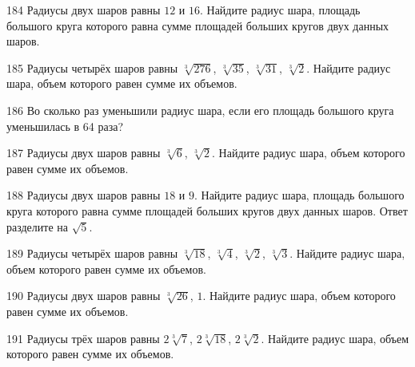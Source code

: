 \documentclass[a4paper]{article}
\begin{document}
\begin{taskBN}{184}
Радиусы двух шаров равны $12$ и $16$. Найдите радиус шара, площадь большого круга которого равна сумме площадей больших кругов двух данных шаров.
\end{taskBN}

\begin{taskBN}{185}
Радиусы четырёх шаров равны $\sqrt[3]{276}$, $\sqrt[3]{35}$, $\sqrt[3]{31}$, $\sqrt[3]{2}$. Найдите радиус шара, объем которого равен сумме их объемов.
\end{taskBN}

\begin{taskBN}{186}
Во сколько раз уменьшили радиус шара, если его площадь большого круга уменьшилась в 64 раза?
\end{taskBN}

\begin{taskBN}{187}
Радиусы двух шаров равны $\sqrt[3]{6}$, $\sqrt[3]{2}$. Найдите радиус шара, объем которого равен сумме их объемов.
\end{taskBN}

\begin{taskBN}{188}
Радиусы двух шаров равны $18$ и $9$. Найдите радиус шара, площадь большого круга которого равна сумме площадей больших кругов двух данных шаров. Ответ разделите на $\sqrt{5}$.
\end{taskBN}

\begin{taskBN}{189}
Радиусы четырёх шаров равны $\sqrt[3]{18}$, $\sqrt[3]{4}$, $\sqrt[3]{2}$, $\sqrt[3]{3}$. Найдите радиус шара, объем которого равен сумме их объемов.
\end{taskBN}

\begin{taskBN}{190}
Радиусы двух шаров равны $\sqrt[3]{26}$, $1$. Найдите радиус шара, объем которого равен сумме их объемов.
\end{taskBN}

\begin{taskBN}{191}
Радиусы трёх шаров равны $2\sqrt[3]{7}$, $2\sqrt[3]{18}$, $2\sqrt[3]{2}$. Найдите радиус шара, объем которого равен сумме их объемов.
\end{taskBN}
\end{document}
